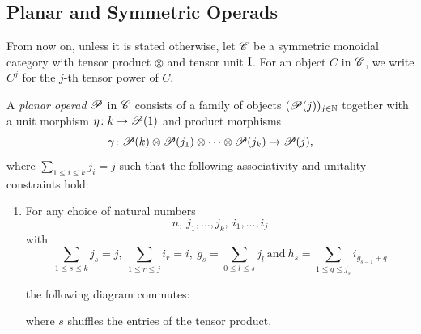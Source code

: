 
    \subsection{Planar and Symmetric Operads}

    From now on, unless it is stated otherwise, let $\C$ be a symmetric monoidal
    category with tensor product $\otimes$ and tensor unit $\I$. For an object
    $C$ in $\C$, we write $C^j$ for the $j$-th tensor power of $C$.

    \begin{defin}\label{planaroperad} A {\em planar operad} $\P$ in $\C$
        consists of a family of objects $(\P(j))_{j \in \N}$ together with a
        unit morphism $\eta \colon k \rightarrow \P(1)$ and product morphisms
        \[
            \gamma \colon \P(k) \otimes \P(j_1) \otimes \cdots \otimes \P(j_k) \rightarrow \P(j),
        \]
        where $\sum_{1 \leq i \leq k} j_i = j$ such that the following
        associativity and unitality constraints hold:
        \begin{enumerate}
            \item For any choice of natural numbers
            \[
                n,  \ j_1, \dots, j_k, \ i_1, \dots, i_j
            \]
            with
            \[
                \sum_{1 \leq s \leq k} j_s = j, ~ \sum_{1 \leq r \leq j} i_r = i, \ g_s = \sum_{0 \leq l \leq s} j_l \ \text{and} \ h_s = \sum_{1 \leq q \leq j_s} i_{g_{s-1}+q}
            \]
            
            the following diagram commutes:
                \begin{center}
                \end{center}
                where $s$ shuffles the entries of the tensor product.
        

\end{enumerate}
\end{defin}
